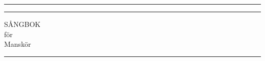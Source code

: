 \documentclass{book}
\begin{document}
	
	\setcounter{secnumdepth}{-1}
	\setlength{\footskip}{70pt}
	
	\begin{titlepage} %
		
		\centering %
		
		
		\rule{\textwidth}{1pt} %
		
		\vspace{2pt}\vspace{-\baselineskip} %
		
		\rule{\textwidth}{0.4pt} %
		
		\vspace{0.1\textheight} %
		
		
		{\Huge S{\AA}NGBOK}\\[0.5\baselineskip] %
		{\large f{\"o}r}\\[0.5\baselineskip] %
		{\Huge Mansk{\"o}r} %
		
		\vspace{0.025\textheight} %
		
		\rule{0.3\textwidth}{0.4pt} %
		
		\vspace{0.1\textheight} %
		
		
		
		\vfill %
		
		
		

\end{titlepage}
\end{document}
